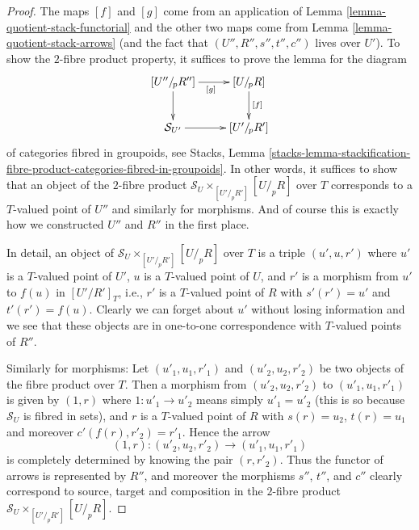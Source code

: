 \documentclass[10pt,a4paper]{amsart}
\theoremstyle{plain}
\theoremstyle{definition}
\theoremstyle{remark}
\numberwithin{equation}{subsection}
\begin{document}
\begin{proof}
The maps $[f]$ and $[g]$ come from an application of
Lemma \ref{lemma-quotient-stack-functorial}
and the other two maps come from
Lemma \ref{lemma-quotient-stack-arrows}
(and the fact that $(U'', R'', s'', t'', c'')$ lives over $U'$).
To show the $2$-fibre product property, it suffices to prove the lemma
for the diagram
$$
\xymatrix{
[U''/_{\!p}R''] \ar[d] \ar[r]_{[g]} & [U/_{\!p}R] \ar[d]^{[f]} \\
\mathcal{S}_{U'} \ar[r] & [U'/_{\!p}R']
}
$$
of categories fibred in groupoids, see
Stacks, Lemma
\ref{stacks-lemma-stackification-fibre-product-categories-fibred-in-groupoids}.
In other words, it suffices to show that an object of the $2$-fibre product
$\mathcal{S}_U \times_{[U'/_{\!p}R']} [U/_{\!p}R]$ over $T$ corresponds
to a $T$-valued point of $U''$ and similarly for morphisms. And of course
this is exactly how we constructed $U''$ and $R''$ in the first place.

\medskip\noindent
In detail, an object of $\mathcal{S}_U \times_{[U'/_{\!p}R']} [U/_{\!p}R]$
over $T$ is a triple $(u', u, r')$ where $u'$ is a $T$-valued point of $U'$,
$u$ is a $T$-valued point of $U$, and $r'$ is a morphism from $u'$ to
$f(u)$ in $[U'/R']_T$, i.e., $r'$ is a $T$-valued point of $R$ with
$s'(r') = u'$ and $t'(r') = f(u)$. Clearly we can forget about $u'$
without losing information and we see that these objects are in one-to-one
correspondence with $T$-valued points of $R''$.

\medskip\noindent
Similarly for morphisms: Let $(u'_1, u_1, r'_1)$ and $(u'_2, u_2, r'_2)$ be
two objects of the fibre product over $T$. Then a morphism from
$(u'_2, u_2, r'_2)$ to $(u'_1, u_1, r'_1)$
is given by $(1, r)$ where $1 : u'_1 \to u'_2$ means simply $u'_1 = u'_2$
(this is so because $\mathcal{S}_U$ is fibred in sets), and $r$ is a
$T$-valued point of $R$ with $s(r) = u_2$, $t(r) = u_1$ and moreover
$c'(f(r), r'_2) = r'_1$. Hence the arrow
$$
(1, r) : (u'_2, u_2, r'_2) \to (u'_1, u_1, r'_1)
$$
is completely determined by knowing the pair $(r, r'_2)$. Thus the functor
of arrows is represented by $R''$, and moreover the morphisms $s''$, $t''$,
and $c''$ clearly correspond to source, target and composition in
the $2$-fibre product $\mathcal{S}_U \times_{[U'/_{\!p}R']} [U/_{\!p}R]$.
\end{proof}
\end{document}
